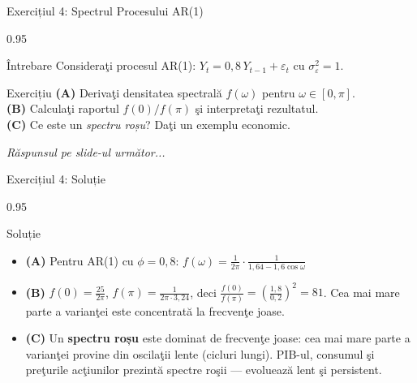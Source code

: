 \documentclass[9pt, aspectratio=169, t]{beamer}
\begin{document}
\begin{frame}{Exercițiul 4: Spectrul Procesului AR(1)}
    \begin{cminipage}{0.95\textwidth}
    \begin{alertblock}{Întrebare}
        Consideraţi procesul AR(1): $Y_t = 0{,}8\,Y_{t-1} + \varepsilon_t$ cu $\sigma^2_\varepsilon = 1$.
    \end{alertblock}

    \vspace{0.2cm}

    \begin{block}{Exercițiu}
        \textcolor{MainBlue}{\textbf{(A)}} Derivaţi densitatea spectrală $f(\omega)$ pentru $\omega \in [0, \pi]$.\\[3pt]
        \textcolor{MainBlue}{\textbf{(B)}} Calculaţi raportul $f(0)/f(\pi)$ şi interpretaţi rezultatul.\\[3pt]
        \textcolor{MainBlue}{\textbf{(C)}} Ce este un \emph{spectru roșu}? Daţi un exemplu economic.
    \end{block}

    \vspace{0.3cm}

    \begin{center}
        \textit{Răspunsul pe slide-ul următor...}
    \end{center}
    \end{cminipage}
\end{frame}

\begin{frame}{Exercițiul 4: Soluție}
    \begin{cminipage}{0.95\textwidth}
    \begin{exampleblock}{Soluție}
        {\small
        \begin{itemize}\setlength{\itemsep}{0pt}
            \item \textcolor{MainBlue}{\textbf{(A)}} Pentru AR(1) cu $\phi = 0{,}8$:
            $f(\omega) = \frac{1}{2\pi}\cdot\frac{1}{1{,}64 - 1{,}6\cos\omega}$
            \item \textcolor{MainBlue}{\textbf{(B)}} $f(0) = \frac{25}{2\pi}$, $f(\pi) = \frac{1}{2\pi \cdot 3{,}24}$, deci
            $\frac{f(0)}{f(\pi)} = \left(\frac{1{,}8}{0{,}2}\right)^2 = 81$.
            Cea mai mare parte a varianţei este concentrată la frecvenţe joase.
            \item \textcolor{MainBlue}{\textbf{(C)}} Un \textbf{spectru roșu} este dominat de frecvenţe joase: cea mai mare parte a varianţei provine din oscilaţii lente (cicluri lungi). PIB-ul, consumul şi preţurile acţiunilor prezintă spectre roşii --- evoluează lent şi persistent.
        \end{itemize}
        }
    \end{exampleblock}
    \end{cminipage}
\end{frame}
\end{document}
